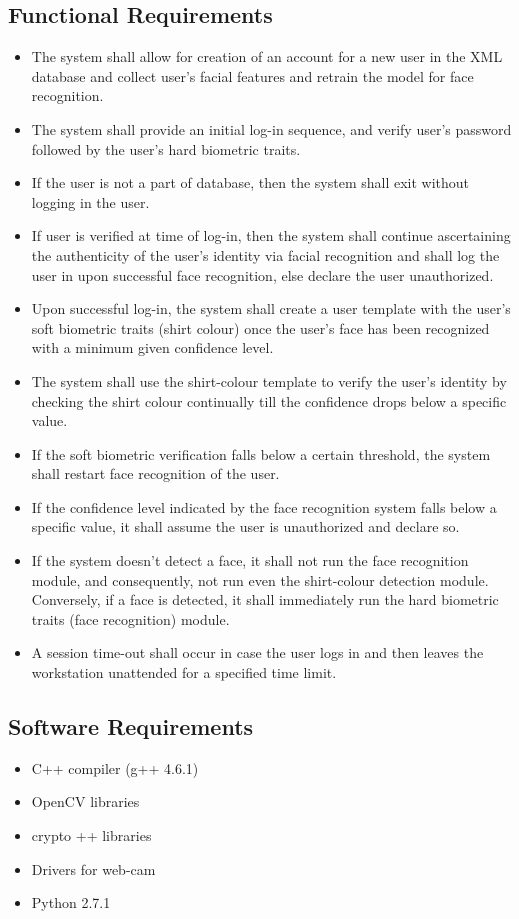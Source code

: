 \documentclass[12pt]{report}			%
\begin{document}
\subsection{ Functional Requirements }
\begin{itemize}
	\item The system shall allow for creation of an account for a new user in the XML database and collect user's facial features and retrain the model for face recognition.
	\item The system shall provide an initial log-in sequence, and verify user's password followed by the user's hard biometric traits.
	\item If the user is not a part of database, then the system shall exit without logging in the user.
	\item If user is verified at time of log-in, then the system shall continue ascertaining the authenticity of the user's identity via facial recognition and shall log the user in upon successful face recognition, else declare the user unauthorized.
	\item Upon successful log-in, the system shall create a user template with the user's soft biometric traits (shirt colour) once the user's face has been recognized with a minimum given confidence level.
	\item The system shall use the shirt-colour template to verify the user's identity by checking the shirt colour continually till the confidence drops below a specific value.
	\item If the soft biometric verification falls below a certain threshold, the system shall restart face recognition of the user.
	\item If the confidence level indicated by the face recognition system falls below a specific value, it shall assume the user is unauthorized and declare so. %
	\item If the system doesn't detect a face, it shall not run the face recognition module, and consequently, not run even the shirt-colour detection module. Conversely, if a face is detected, it shall immediately run the hard biometric traits (face recognition) module.
	\item A session time-out shall occur in case the user logs in and then leaves the workstation unattended for a specified time limit.
\end{itemize}

\subsection{ Software Requirements }
\begin{itemize}
\item C++ compiler (g++ 4.6.1)
\item OpenCV libraries
\item crypto ++ libraries
\item Drivers for web-cam
\item Python 2.7.1
\end{itemize}
\end{document}
